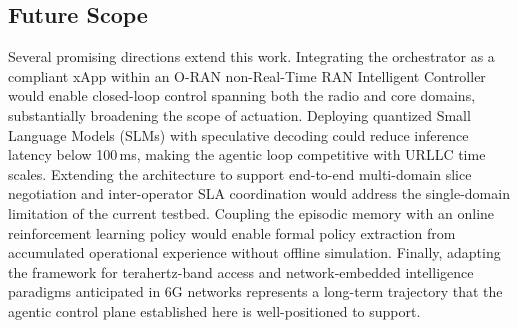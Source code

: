\documentclass[12pt]{article}
\begin{document}
\subsection{Future Scope}

Several promising directions extend this work. Integrating the
orchestrator as a compliant xApp within an O-RAN non-Real-Time RAN
Intelligent Controller would enable closed-loop control spanning both the
radio and core domains, substantially broadening the scope of actuation.
Deploying quantized Small Language Models (SLMs) with speculative decoding
could reduce inference latency below 100\,ms, making the agentic loop
competitive with URLLC time scales. Extending the architecture to support
end-to-end multi-domain slice negotiation and inter-operator SLA
coordination would address the single-domain limitation of the current
testbed. Coupling the episodic memory with an online reinforcement
learning policy would enable formal policy extraction from accumulated
operational experience without offline simulation. Finally, adapting the
framework for terahertz-band access and network-embedded intelligence
paradigms anticipated in 6G networks represents a long-term trajectory
that the agentic control plane established here is well-positioned to
support.
\end{document}
